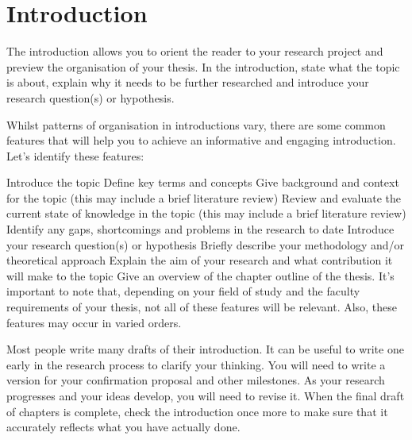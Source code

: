 
\chapter{Introduction}\label{ch:introduction}

%
%


The introduction allows you to orient the reader to your research project and preview the organisation of your thesis. In the introduction, state what the topic is about, explain why it needs to be further researched and introduce your research question(s) or hypothesis.

Whilst patterns of organisation in introductions vary, there are some common features that will help you to achieve an informative and engaging introduction. Let’s identify these features:

Introduce the topic
Define key terms and concepts
Give background and context for the topic (this may include a brief literature review)
Review and evaluate the current state of knowledge in the topic (this may include a brief literature review)
Identify any gaps, shortcomings and problems in the research to date
Introduce your research question(s) or hypothesis
Briefly describe your methodology and/or theoretical approach
Explain the aim of your research and what contribution it will make to the topic
Give an overview of the chapter outline of the thesis.
It’s important to note that, depending on your field of study and the faculty requirements of your thesis, not all of these features will be relevant. Also, these features may occur in varied orders.

Most people write many drafts of their introduction. It can be useful to write one early in the research process to clarify your thinking. You will need to write a version for your confirmation proposal and other milestones. As your research progresses and your ideas develop, you will need to revise it. When the final draft of chapters is complete, check the introduction once more to make sure that it accurately reflects what you have actually done.

